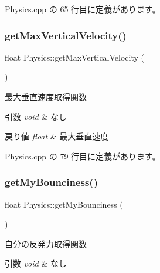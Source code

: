  Physics.\+cpp の 65 行目に定義があります。

\mbox{\label{class_physics_a80d556fa40945e73ca6d4d6931b743ad}} 
\subsubsection{\texorpdfstring{get\+Max\+Vertical\+Velocity()}{getMaxVerticalVelocity()}}
{\footnotesize\ttfamily float Physics\+::get\+Max\+Vertical\+Velocity (\begin{DoxyParamCaption}{ }\end{DoxyParamCaption})}



最大垂直速度取得関数 


\begin{DoxyParams}{引数}
{\em void} & なし \\
\hline
\end{DoxyParams}

\begin{DoxyRetVals}{戻り値}
{\em float} & 最大垂直速度 \\
\hline
\end{DoxyRetVals}


 Physics.\+cpp の 79 行目に定義があります。

\mbox{\label{class_physics_a25433df081fc471e1e5d475f718f116b}} 
\subsubsection{\texorpdfstring{get\+My\+Bounciness()}{getMyBounciness()}}
{\footnotesize\ttfamily float Physics\+::get\+My\+Bounciness (\begin{DoxyParamCaption}{ }\end{DoxyParamCaption})}



自分の反発力取得関数 


\begin{DoxyParams}{引数}
{\em void} & なし \\
\hline
\end{DoxyParams}

